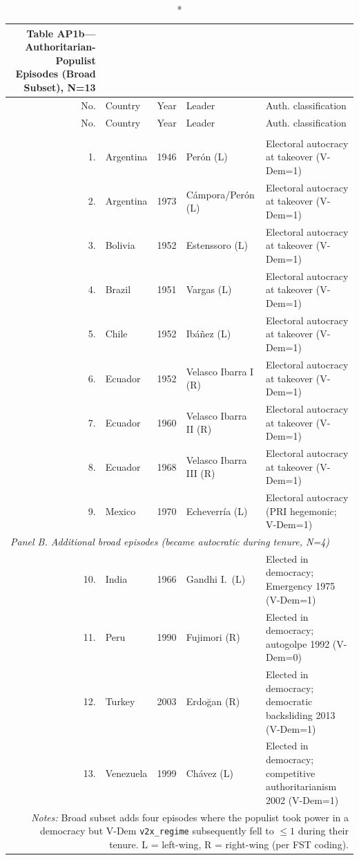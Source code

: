 \def\sym#1{\ifmmode^{#1}\else\(\^{#1}\)\fi}
\setlength{\tabcolsep}{5pt}
{\footnotesize
\begin{longtable}{rp{2.2cm}p{2.4cm}p{3.2cm}p{3.8cm}}
\caption*{\textbf{Table AP1b---Authoritarian-Populist Episodes (Broad Subset), N=13}} \\
\hline\hline
No. & Country & Year & Leader & Auth. classification \\
\hline
\endfirsthead
\hline\hline
No. & Country & Year & Leader & Auth. classification \\
\hline
\endhead
\hline
\endfoot
\multicolumn{5}{l}{\textit{Panel A. Strict subset (autocracy at takeover, N=9)}} \\
\hline
1. & Argentina & 1946 & Per\'on (L) & Electoral autocracy at takeover (V-Dem=1) \\
2. & Argentina & 1973 & C\'ampora/Per\'on (L) & Electoral autocracy at takeover (V-Dem=1) \\
3. & Bolivia & 1952 & Estenssoro (L) & Electoral autocracy at takeover (V-Dem=1) \\
4. & Brazil & 1951 & Vargas (L) & Electoral autocracy at takeover (V-Dem=1) \\
5. & Chile & 1952 & Ib\'a\~nez (L) & Electoral autocracy at takeover (V-Dem=1) \\
6. & Ecuador & 1952 & Velasco Ibarra I (R) & Electoral autocracy at takeover (V-Dem=1) \\
7. & Ecuador & 1960 & Velasco Ibarra II (R) & Electoral autocracy at takeover (V-Dem=1) \\
8. & Ecuador & 1968 & Velasco Ibarra III (R) & Electoral autocracy at takeover (V-Dem=1) \\
9. & Mexico & 1970 & Echeverr\'ia (L) & Electoral autocracy (PRI hegemonic; V-Dem=1) \\
\hline
\multicolumn{5}{l}{\textit{Panel B. Additional broad episodes (became autocratic during tenure, N=4)}} \\
\hline
10. & India & 1966 & Gandhi I.\ (L) & Elected in democracy; Emergency 1975 (V-Dem=1) \\
11. & Peru & 1990 & Fujimori (R) & Elected in democracy; autogolpe 1992 (V-Dem=0) \\
12. & Turkey & 2003 & Erdo\u{g}an (R) & Elected in democracy; democratic backsliding 2013 (V-Dem=1) \\
13. & Venezuela & 1999 & Ch\'avez (L) & Elected in democracy; competitive authoritarianism 2002 (V-Dem=1) \\
\hline\hline
\multicolumn{5}{p{14cm}}{\textit{Notes:} Broad subset adds four episodes where the populist took power in a democracy but V-Dem \texttt{v2x\_regime} subsequently fell to $\leq 1$ during their tenure. L = left-wing, R = right-wing (per FST coding).} \\
\end{longtable}
}
